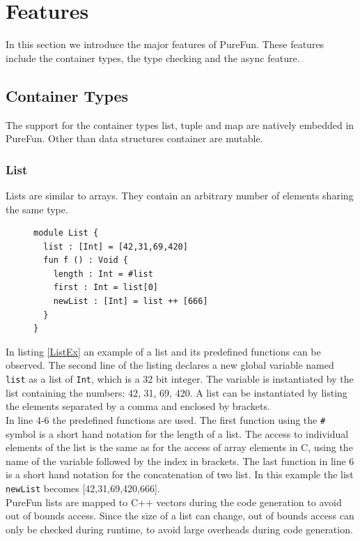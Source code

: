 \section{Features}
In this section we introduce the major features of PureFun. These features include the container types, the type checking and the async feature.
\subsection{Container Types}
The support for the container types list, tuple and map are natively embedded in PureFun. Other than data structures container are mutable.
\subsubsection{List}
Lists are similar to arrays. They contain an arbitrary number of elements sharing the same type.

\begin{figure}
\begin{lstlisting}[caption={PureFun code with a list and its predefined functions.},label={ListEx}]
module List {
  list : [Int] = [42,31,69,420]
  fun f () : Void {
    length : Int = #list
    first : Int = list[0]
    newList : [Int] = list ++ [666]
  }
}
\end{lstlisting}
\end{figure}
In listing \ref{ListEx} an example of a list and its predefined functions can be observed. The second line of the listing declares a new global variable named \texttt{list} as a list of \texttt{Int}, which is a 32 bit integer. The variable is instantiated by the list containing the numbers: 42, 31, 69, 420. A list can be instantiated by listing the elements separated by a comma and enclosed by brackets.\\
In line 4-6 the predefined functions are used. The first function using the \texttt{\#} symbol is a short hand notation for the length of a list. The access to individual elements of the list is the same as for the access of array elements in C, using the name of the variable followed by the index in brackets. The last function in line 6 is a short hand notation for the concatenation of two list. In this example the list \texttt{newList} becomes [42,31,69,420,666].\\
PureFun lists are mapped to C++ vectors during the code generation to avoid out of bounds access. Since the size of a list can change, out of bounds access can only be checked during runtime, to avoid large overheads during code generation.
